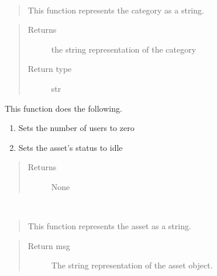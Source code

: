 \documentclass[letterpaper,10pt,english]{sphinxmanual}
\begin{document}
\begin{fulllineitems}

\begin{fulllineitems}
\label{asset:asset.Asset.print_category}~\begin{quote}

This function represents the category as a string.
\end{quote}
\begin{quote}\begin{description}
\item[{Returns}] \leavevmode
the string representation of the category

\item[{Return type}] \leavevmode
str

\end{description}\end{quote}

\end{fulllineitems}


\begin{fulllineitems}
\label{asset:asset.Asset.reset}
This function does the following.
\begin{enumerate}
\item {} 
Sets the number of users to zero

\item {} 
Sets the asset's status to idle

\end{enumerate}
\begin{quote}\begin{description}
\item[{Returns}] \leavevmode
None

\end{description}\end{quote}

\end{fulllineitems}


\begin{fulllineitems}
\label{asset:asset.Asset.toString}~\begin{quote}

This function represents the asset as a string.
\end{quote}
\begin{quote}\begin{description}
\item[{Return msg}] \leavevmode
The string representation of the asset object.


\end{description}
\end{quote}
\end{fulllineitems}
\end{fulllineitems}
\end{document}

